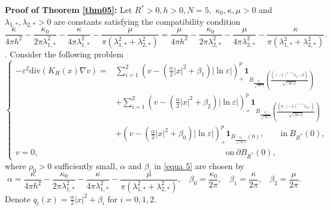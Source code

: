 \documentclass[12pt,reqno]{amsart}
\numberwithin{equation}{section}
\theoremstyle{definition}
\theoremstyle{remark}
\begin{document}
\textbf{Proof of Theorem \ref{thm05}:}
Let $   R^*>0, h>0, N=5, $ $ \kappa_0,\kappa,\mu>0 $ and $ \lambda_{1,*},\lambda_{2,*}>0 $ are constants satisfying the compatibility condition
\begin{equation*} 
\frac{\kappa}{4\pi h^2}-\frac{\kappa_0}{2\pi\lambda_{1,*}^2}-\frac{\kappa}{4\pi\lambda_{1,*}^2}-\frac{\mu}{\pi(\lambda_{1,*}^2+\lambda_{2,*}^2)}=\frac{\mu}{4\pi h^2}-\frac{\kappa_0}{2\pi\lambda_{2,*}^2}-\frac{\mu}{4\pi\lambda_{2,*}^2}-\frac{\kappa}{\pi(\lambda_{1,*}^2+\lambda_{2,*}^2)}.
\end{equation*}. 
Consider  the following problem
\begin{equation}\label{equa 5}
\begin{cases}
-\varepsilon^2\text{div}(K_H(x)\nabla v)=&\sum_{i=1}^2\left (v-\left(\frac{\alpha}{2}|x|^2+\beta_1 \right)|\ln\varepsilon| \right )^{p}_+\textbf{1}_{B_{\frac{\rho_0}{\sqrt{|\ln\varepsilon|}}}\left (\frac{((-1)^{i-1}\lambda_{1,*},0)}{\sqrt{|\ln\varepsilon|}}\right )}\\
&+\sum_{i=1}^2\left (v-\left(\frac{\alpha}{2}|x|^2+\beta_2 \right)|\ln\varepsilon| \right )^{p}_+\textbf{1}_{B_{\frac{\rho_0}{\sqrt{|\ln\varepsilon|}}}\left (\frac{(0,(-1)^{i-1}\lambda_{2,*})}{\sqrt{|\ln\varepsilon|}}\right )}\\
&+\left (v-\left(\frac{\alpha}{2}|x|^2+\beta_0 \right)|\ln\varepsilon| \right )^{p}_+\textbf{1}_{B_{\frac{\rho_0}{\sqrt{|\ln\varepsilon|}}}\left (0\right )},\ \ \ \ \ \ \ \ \ \text{in}\  B_{R^*}(0),\\
v=0,&\ \ \ \ \ \ \ \ \ \ \ \ \ \ \ \ \ \ \ \ \ \ \ \ \ \ \ \ \ \ \ \ \ \ \ \ \ \ \ \ \ \ \ \ \ \ \ \ \ \ \ \ \ \ \ \ \ \ \ \ \text{on}\ \partial B_{R^*}(0),
\end{cases}
\end{equation}
where  $ \rho_0>0 $ sufficiently small, %
$ \alpha $ and $ \beta_i $ in \eqref{equa 5} are chosen by
\begin{equation*}
\alpha=\frac{\kappa}{4\pi h^2}-\frac{\kappa_0}{2\pi\lambda_{1,*}^2}-\frac{\kappa}{4\pi\lambda_{1,*}^2}-\frac{\mu}{\pi(\lambda_{1,*}^2+\lambda_{2,*}^2)},\ \ \ \ \beta_0=\frac{\kappa_0}{2\pi},\ \ \ \ \beta_1=\frac{\kappa}{2\pi},\ \ \ \ \beta_2=\frac{\mu}{2\pi}.
\end{equation*}
Denote $ q_i(x)=\frac{\alpha}{2}|x|^2+\beta_i $ for $ i=0,1,2. $
\end{document}
